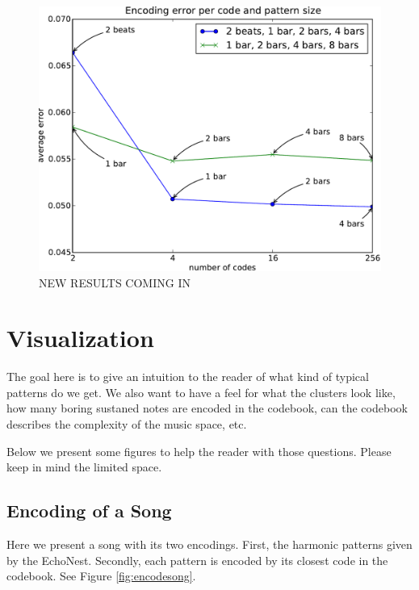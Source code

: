 \documentclass{article}
\begin{document}
\begin{figure}[htb]
\begin{center}
\includegraphics[width=.99\columnwidth]{codesize_patternsize}
\end{center}
\caption{\small{NEW RESULTS COMING IN}}
\label{fig:size_pattern}
\end{figure}

\section{Visualization} \label{sec:visu}
The goal here is to give an intuition to the reader of what kind of
typical patterns do we get. We also want to have a feel for what the
clusters look like, how many boring sustaned notes are encoded in the
codebook, can the codebook describes the complexity of the music space, etc.

Below we present some figures to help the reader with those questions.
Please keep in mind the limited space.

\subsection{Encoding of a Song}
Here we present a song with its two encodings. First, the harmonic patterns
given by the EchoNest. Secondly, each pattern is encoded by its closest
code in the codebook. See Figure \ref{fig:encodesong}.
\end{document}
